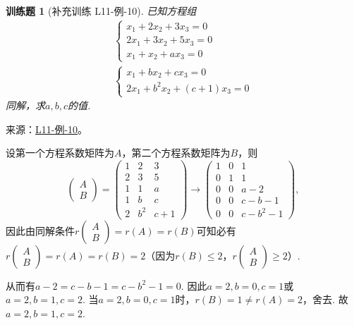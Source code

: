 \documentclass[UTF8,12pt,a4paper,fontset=fandol]{ctexart}
\newtheorem{exercise}{训练题}[section]
\begin{document}
\begin{exercise}[补充训练 L11-例-10]\label{prob:L11-例-10}
已知方程组\begin{gather*}
        \begin{cases}
            x_1+2x_2+3x_3=0  \\
            2x_1+3x_2+5x_3=0 \\
            x_1+x_2+ax_3=0
        \end{cases} \\
        \begin{cases}
            x_1+bx_2+cx_3=0 \\
            2x_1+b^2x_2+(c+1)x_3=0
        \end{cases}
    \end{gather*}
    同解，求$a,b,c$的值.
\end{exercise}
\noindent 来源：\href{https://github.com/yhwu-is/Linear-Algebra-Left-Undone/blob/new/%E8%AE%B2%E4%B9%89/%E4%B8%93%E9%A2%98/11%20%E6%9C%9D%E8%8A%B1%E5%A4%95%E6%8B%BE.tex}{L11-例-10}。
\begin{solve}
设第一个方程系数矩阵为$A$，第二个方程系数矩阵为$B$，则
    \[\begin{pmatrix}
            A \\ B
        \end{pmatrix}=\begin{pmatrix}
            1 & 2 & 3 \\ 2 & 3 & 5 \\ 1 & 1 & a \\ 1 & b & c \\ 2 & b^2 & c+1
        \end{pmatrix}\to\begin{pmatrix}
            1 & 0 & 1 \\ 0 & 1 & 1 \\ 0 & 0 & a-2 \\ 0 & 0 & c-b-1 \\ 0 & 0 & c-b^2-1
        \end{pmatrix},\]
    因此由同解条件$r\begin{pmatrix}
            A \\ B
        \end{pmatrix}=r(A)=r(B)$可知必有$r\begin{pmatrix}
            A \\ B
        \end{pmatrix}=r(A)=r(B)=2$（因为$r(B)\leqslant 2$，$r\begin{pmatrix}
            A \\ B
        \end{pmatrix}\geqslant 2$）.

    从而有$a-2=c-b-1=c-b^2-1=0$. 因此$a=2,b=0,c=1$或$a=2,b=1,c=2$. 当$a=2,b=0,c=1$时，$r(B)=1\neq r(A)=2$，舍去. 故$a=2,b=1,c=2$.
\end{solve}
\end{document}
